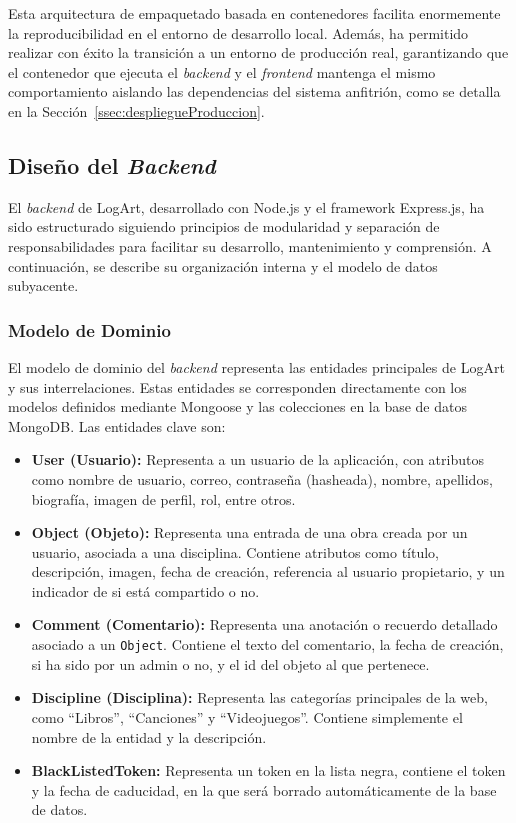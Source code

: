 Esta arquitectura de empaquetado basada en contenedores facilita enormemente la reproducibilidad en el entorno de desarrollo local. Además, ha permitido realizar con éxito la transición a un entorno de producción real, garantizando que el contenedor que ejecuta el \textit{backend} y el \textit{frontend} mantenga el mismo comportamiento aislando las dependencias del sistema anfitrión, como se detalla en la Sección~\ref{ssec:despliegueProduccion}.

\subsection{Diseño del \textit{Backend}}
\label{ssec:disenoBackend}

El \textit{backend} de LogArt, desarrollado con Node.js y el framework Express.js, ha sido estructurado siguiendo principios de modularidad y separación de responsabilidades para facilitar su desarrollo, mantenimiento y comprensión. A continuación, se describe su organización interna y el modelo de datos subyacente.

\subsubsection{Modelo de Dominio}
\label{sssec:modeloDominioBackend}

El modelo de dominio del \textit{backend} representa las entidades principales de LogArt y sus interrelaciones. Estas entidades se corresponden directamente con los modelos definidos mediante Mongoose y las colecciones en la base de datos MongoDB. Las entidades clave son:
\begin{itemize}
    \item \textbf{User (Usuario):} Representa a un usuario de la aplicación, con atributos como nombre de usuario, correo, contraseña (hasheada), nombre, apellidos, biografía, imagen de perfil, rol, entre otros.
    \item \textbf{Object (Objeto):} Representa una entrada de una obra creada por un usuario, asociada a una disciplina. Contiene atributos como título, descripción, imagen, fecha de creación, referencia al usuario propietario, y un indicador de si está compartido o no.
    \item \textbf{Comment (Comentario):} Representa una anotación o recuerdo detallado asociado a un \texttt{Object}. Contiene el texto del comentario, la fecha de creación, si ha sido por un admin o no, y el id del objeto al que pertenece.
    \item \textbf{Discipline (Disciplina):} Representa las categorías principales de la web, como ``Libros'', ``Canciones'' y ``Videojuegos''. Contiene simplemente el nombre de la entidad y la descripción.
    \item \textbf{BlackListedToken:} Representa un token en la lista negra, contiene el token y la fecha de caducidad, en la que será borrado automáticamente de la base de datos.
\end{itemize}

